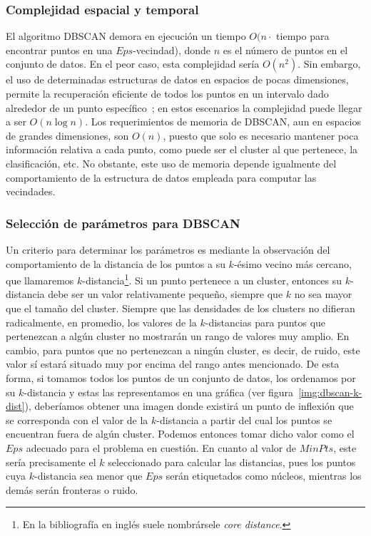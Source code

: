 \subsubsection{Complejidad espacial y temporal}

El algoritmo DBSCAN demora en ejecución un tiempo $O(n \cdot$ tiempo para encontrar puntos en una $Eps$-vecindad), donde $n$ es el número de puntos en el conjunto de datos.
En el peor caso, esta complejidad sería $O(n^2)$.
Sin embargo, el uso de determinadas estructuras de datos en espacios de pocas dimensiones, permite la recuperación eficiente de todos los puntos en un intervalo dado alrededor de un punto específico~\cite{Tan05};
en estos escenarios la complejidad puede llegar a ser $O(n\log n)$.
Los requerimientos de memoria de DBSCAN, aun en espacios de grandes dimensiones, son $O(n)$, puesto que solo es necesario mantener poca información relativa a cada punto, como puede ser el cluster al que pertenece, la clasificación, etc.
No obstante, este uso de memoria depende igualmente del comportamiento de la estructura de datos empleada para computar las vecindades.

\subsubsection{Selección de parámetros para DBSCAN}\label{subsubsec:paramsDBSCAN}

Un criterio para determinar los parámetros es mediante la observación del comportamiento de la distancia de los puntos a su $k$-ésimo vecino más cercano, que llamaremos $k$-distancia\footnote{En la bibliografía en inglés suele nombrársele \textit{core distance}.}.
Si un punto pertenece a un cluster, entonces su $k$-distancia debe ser un valor relativamente pequeño, siempre que $k$ no sea mayor que el tamaño del cluster.
Siempre que las densidades de los clusters no difieran radicalmente, en promedio, los valores de la $k$-distancias para puntos que pertenezcan a algún cluster no mostrarán un rango de valores muy amplio.
En cambio, para puntos que no pertenezcan a ningún cluster, es decir, de ruido, este valor sí estará situado muy por encima del rango antes mencionado.
De esta forma, si tomamos todos los puntos de un conjunto de datos, los ordenamos por su $k$-distancia y estas las representamos en una gráfica (ver figura~\ref{img:dbscan-k-dist}), deberíamos obtener una imagen donde existirá un punto de inflexión que se corresponda con el valor de la $k$-distancia a partir del cual los puntos se encuentran fuera de algún cluster.
Podemos entonces tomar dicho valor como el $Eps$ adecuado para el problema en cuestión.
En cuanto al valor de $MinPts$, este sería precisamente el $k$ seleccionado para calcular las distancias, pues los puntos cuya $k$-distancia sea menor que $Eps$ serán etiquetados como núcleos, mientras los demás serán fronteras o ruido.

